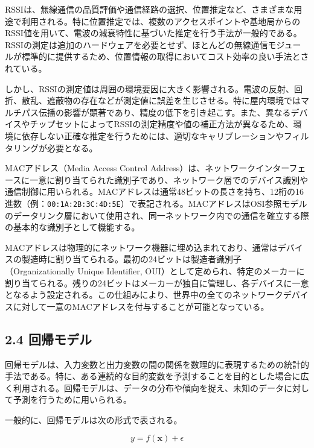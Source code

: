 RSSIは、無線通信の品質評価や通信経路の選択、位置推定など、さまざまな用途で利用される。特に位置推定では、複数のアクセスポイントや基地局からのRSSI値を用いて、電波の減衰特性に基づいた推定を行う手法が一般的である。RSSIの測定は追加のハードウェアを必要とせず、ほとんどの無線通信モジュールが標準的に提供するため、位置情報の取得においてコスト効率の良い手法とされている。

しかし、RSSIの測定値は周囲の環境要因に大きく影響される。電波の反射、回折、散乱、遮蔽物の存在などが測定値に誤差を生じさせる。特に屋内環境ではマルチパス伝播の影響が顕著であり、精度の低下を引き起こす。また、異なるデバイスやチップセットによってRSSIの測定精度や値の補正方法が異なるため、環境に依存しない正確な推定を行うためには、適切なキャリブレーションやフィルタリングが必要となる。


MACアドレス（Media Access Control Address）は、ネットワークインターフェースに一意に割り当てられた識別子であり、ネットワーク層でのデバイス識別や通信制御に用いられる。MACアドレスは通常48ビットの長さを持ち、12桁の16進数（例：\texttt{00:1A:2B:3C:4D:5E}）で表記される。MACアドレスはOSI参照モデルのデータリンク層において使用され、同一ネットワーク内での通信を確立する際の基本的な識別子として機能する。

MACアドレスは物理的にネットワーク機器に埋め込まれており、通常はデバイスの製造時に割り当てられる。最初の24ビットは製造者識別子（Organizationally Unique Identifier, OUI）として定められ、特定のメーカーに割り当てられる。残りの24ビットはメーカーが独自に管理し、各デバイスに一意となるよう設定される。この仕組みにより、世界中の全てのネットワークデバイスに対して一意のMACアドレスを付与することが可能となっている。

\subsection*{2.4 回帰モデル}
回帰モデルは、入力変数と出力変数の間の関係を数理的に表現するための統計的手法である。特に、ある連続的な目的変数を予測することを目的とした場合に広く利用される。回帰モデルは、データの分布や傾向を捉え、未知のデータに対して予測を行うために用いられる。

一般的に、回帰モデルは次の形式で表される。

\begin{equation}
	y = f(\mathbf{x}) + \epsilon
\end{equation}

